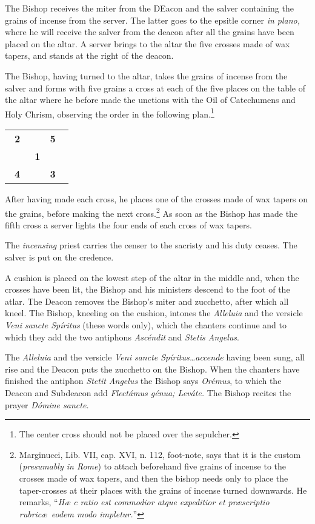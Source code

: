 \documentclass[letterpaper]{report}
\newcommand\crossplan{
\begin{center}
    \begin{tabular}{ | l c r | }
       \hline
       \cross\ \textbf{2} &                    & \textbf{5} \cross\ \\
                          & \cross\ \textbf{1} &                    \\
       \cross\ \textbf{4} &                    & \textbf{3} \cross\ \\
       \hline
   \end{tabular} 
\end{center}
}
\begin{document}
{The Bishop receives the miter from the DEacon and the salver containing the
grains of incense from the server. The latter goes to the epsitle corner
\textit{in plano,} where he will receive the salver from the deacon after all
the grains have been placed on the altar. A server brings to the altar the five
crosses made of wax tapers, and stands at the right of the deacon.

\rubric The Bishop, having turned to the altar, takes the grains of incense
from the salver and forms with five grains a cross at each of the five places
on the table of the altar where he before made the unctions with the Oil of
Catechumens and Holy Chrism, observing the order in the following
plan.\footnote{The center cross should not be placed over the sepulcher.}

\crossplan

After having made each cross, he places one of the crosses made of wax tapers
on the grains, before making the next cross.\footnote{Marginucci, Lib. VII,
cap. XVI, n. 112, foot-note, says that it is the custom (\textit{presumably in
Rome}) to attach beforehand five grains of incense to the crosses made of wax
tapers, and then the bishop needs only to place the taper-crosses at their
places with the grains of incense turned downwards. He remarks, ``\textit{H\ae
c ratio est commodior atque expeditior et pr\ae scriptio rubric\ae\ eodem modo
impletur.}''} As soon as the Bishop has made the fifth cross a server lights
the four ends of each cross of wax tapers.

The \textit{incensing} priest carries the censer to the sacristy and his duty
ceases. The salver is put on the credence.

\rubric A cushion is placed on the lowest step of the altar in the middle and,
when the crosses have been lit, the Bishop and his ministers descend to the
foot of the atlar. The Deacon removes the Bishop's miter and zucchetto, after
which all kneel. The Bishop, kneeling on the cushion, intones the
\textit{Alleluia} and the versicle \textit{Veni sancte Spíritus} (these words
only), which the chanters continue and to which they add the two antiphons
\textit{Ascéndit} and \textit{Stetis Angelus}.

\rubric The \textit{Alleluia} and the versicle \textit{Veni sancte
Spíritus\dots accende} having been sung, all rise and the Deacon puts the
zucchetto on the Bishop. When the chanters have finished the antiphon
\textit{Stetit Angelus} the Bishop says \textit{Orémus}, to which the Deacon
and Subdeacon add \textit{Flectámus génua; Leváte.} The Bishop recites the
prayer \textit{Dómine sancte.}

}
\end{document}
